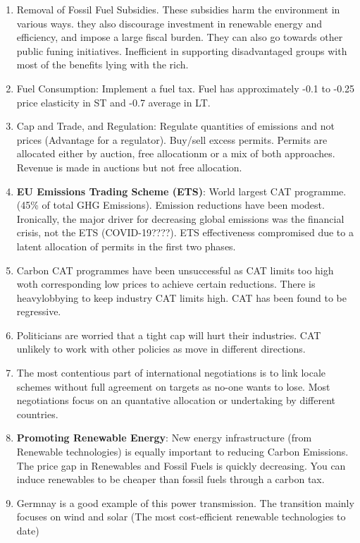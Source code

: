 \documentclass[12pt]{article}
\begin{document}
    \begin{enumerate}
        \item Removal of Fossil Fuel Subsidies. These subsidies harm the environment in various ways. they also discourage investment in renewable energy and efficiency, and impose a large fiscal burden.
        They can also go towards other public funing initiatives. Inefficient in supporting disadvantaged groups with most of the benefits lying with the rich.
        \item Fuel Consumption: Implement a fuel tax. Fuel has approximately -0.1 to -0.25 price elasticity in ST and -0.7 average in LT.
        \item Cap and Trade, and Regulation: Regulate quantities of emissions and not prices (Advantage for a regulator). Buy/sell excess permits. 
        Permits are allocated either by auction, free allocationm or a mix of both approaches. Revenue is made in auctions but not free allocation.
        \item \textbf{EU Emissions Trading Scheme (ETS)}: World largest CAT programme. (45\% of total GHG Emissions). Emission reductions have been modest. Ironically, 
        the major driver for decreasing global emissions was the financial crisis, not the ETS (COVID-19????). ETS effectiveness compromised due to a latent allocation of permits in the first two phases.
        \item Carbon CAT programmes have been unsuccessful as CAT limits too high woth corresponding low prices to achieve certain reductions. There is heavylobbying to keep industry CAT limits high. CAT has been found to be regressive.
        \item Politicians are worried that a tight cap will hurt their industries. CAT unlikely to work with other policies as move in different directions.
        \item The most contentious part of international negotiations is to link locale schemes without full agreement on targets as no-one wants to lose. Most negotiations focus on an quantative allocation or undertaking by different countries.
        \item \textbf{Promoting Renewable Energy}: New energy infrastructure (from Renewable technologies) is equally important to reducing Carbon Emissions. The price gap in Renewables and Fossil Fuels is quickly decreasing. You can induce renewables to be cheaper than fossil fuels through a carbon tax.
        \item Germnay is a good example of this power transmission. The transition mainly focuses on wind and solar (The most cost-efficient renewable technologies to date)
    \end{enumerate}
\end{document}
